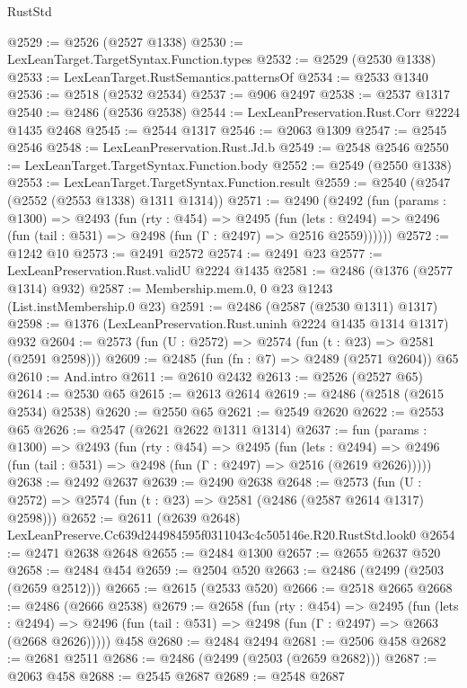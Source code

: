 \begin{lexlean}{RustStd}
\begin{coremodule}
@2529 := @2526 (@2527 @1338)
@2530 := LexLeanTarget.TargetSyntax.Function.types
@2532 := @2529 (@2530 @1338)
@2533 := LexLeanTarget.RustSemantics.patternsOf
@2534 := @2533 @1340
@2536 := @2518 (@2532 @2534)
@2537 := @906 @2497
@2538 := @2537 @1317
@2540 := @2486 (@2536 @2538)
@2544 := LexLeanPreservation.Rust.Corr @2224 @1435 @2468
@2545 := @2544 @1317
@2546 := @2063 @1309
@2547 := @2545 @2546
@2548 := LexLeanPreservation.Rust.Jd.b
@2549 := @2548 @2546
@2550 := LexLeanTarget.TargetSyntax.Function.body
@2552 := @2549 (@2550 @1338)
@2553 := LexLeanTarget.TargetSyntax.Function.result
@2559 := @2540 (@2547 (@2552 (@2553 @1338) @1311 @1314))
@2571 := @2490
    (@2492
      (fun (params : @1300) =>
      @2493
        (fun (rty : @454) =>
        @2495
          (fun (lets : @2494) =>
          @2496 (fun (tail : @531) => @2498 (fun (Γ : @2497) => @2516 @2559))))))
@2572 := @1242 @10
@2573 := @2491 @2572
@2574 := @2491 @23
@2577 := LexLeanPreservation.Rust.validU @2224 @1435
@2581 := @2486 (@1376 (@2577 @1314) @932)
@2587 := Membership.mem.{0, 0} @23 @1243 (List.instMembership.{0} @23)
@2591 := @2486 (@2587 (@2530 @1311) @1317)
@2598 := @1376 (LexLeanPreservation.Rust.uninh @2224 @1435 @1314 @1317) @932
@2604 := @2573 (fun (U : @2572) => @2574 (fun (t : @23) => @2581 (@2591 @2598)))
@2609 := @2485 (fun (fn : @7) => @2489 (@2571 @2604)) @65
@2610 := And.intro
@2611 := @2610 @2432
@2613 := @2526 (@2527 @65)
@2614 := @2530 @65
@2615 := @2613 @2614
@2619 := @2486 (@2518 (@2615 @2534) @2538)
@2620 := @2550 @65
@2621 := @2549 @2620
@2622 := @2553 @65
@2626 := @2547 (@2621 @2622 @1311 @1314)
@2637 := fun (params : @1300) =>
  @2493
    (fun (rty : @454) =>
    @2495
      (fun (lets : @2494) =>
      @2496 (fun (tail : @531) => @2498 (fun (Γ : @2497) => @2516 (@2619 @2626)))))
@2638 := @2492 @2637
@2639 := @2490 @2638
@2648 := @2573 (fun (U : @2572) => @2574 (fun (t : @23) => @2581 (@2486 (@2587 @2614 @1317) @2598)))
@2652 := @2611 (@2639 @2648) LexLeanPreserve.Cc639d244984595f0311043c4c505146e.R20.RustStd.look0
@2654 := @2471 @2638 @2648
@2655 := @2484 @1300
@2657 := @2655 @2637 @520
@2658 := @2484 @454
@2659 := @2504 @520
@2663 := @2486 (@2499 (@2503 (@2659 @2512)))
@2665 := @2615 (@2533 @520)
@2666 := @2518 @2665
@2668 := @2486 (@2666 @2538)
@2679 := @2658
    (fun (rty : @454) =>
    @2495
      (fun (lets : @2494) =>
      @2496 (fun (tail : @531) => @2498 (fun (Γ : @2497) => @2663 (@2668 @2626)))))
    @458
@2680 := @2484 @2494
@2681 := @2506 @458
@2682 := @2681 @2511
@2686 := @2486 (@2499 (@2503 (@2659 @2682)))
@2687 := @2063 @458
@2688 := @2545 @2687
@2689 := @2548 @2687

\end{coremodule}
\end{lexlean}
